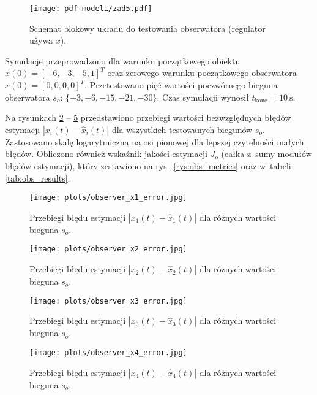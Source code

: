 \documentclass[a4paper,titlepage,11pt,floatssmall]{mwrep} %
\begin{document}
\begin{figure}[H]
    \centering
    \texttt{[image: pdf-modeli/zad5.pdf]}
    \caption{Schemat blokowy układu do testowania obserwatora (regulator używa $x$).}
    \label{rys:test_obs_simulink}
\end{figure}

Symulacje przeprowadzono dla warunku początkowego obiektu $x(0) = [-6, -3, -5, 1]^T$ oraz zerowego warunku początkowego obserwatora $\hat{x}(0) = [0, 0, 0, 0]^T$. Przetestowano pięć wartości poczwórnego bieguna obserwatora $s_o$: $\{-3, -6, -15, -21, -30\}$. Czas symulacji wynosił $t_{\text{konc}} = \SI{10}{\second}$.

Na rysunkach \ref{rys:obs_err_x1} -- \ref{rys:obs_err_x4} przedstawiono przebiegi wartości bezwzględnych błędów estymacji $|x_i(t) - \hat{x}_i(t)|$ dla wszystkich testowanych biegunów $s_o$. Zastosowano skalę logarytmiczną na osi pionowej dla lepszej czytelności małych błędów. Obliczono również wskaźnik jakości estymacji $J_o$ (całka z~sumy modułów błędów estymacji), który zestawiono na rys.~\ref{rys:obs_metrics} oraz w~tabeli \ref{tab:obs_results}.

\begin{figure}[H]
    \centering
    \texttt{[image: plots/observer\_x1\_error.jpg]}
    \caption{Przebiegi błędu estymacji $|x_1(t) - \hat{x}_1(t)|$ dla różnych wartości bieguna $s_o$.}
    \label{rys:obs_err_x1}
\end{figure}

\begin{figure}[H]
    \centering
    \texttt{[image: plots/observer\_x2\_error.jpg]}
    \caption{Przebiegi błędu estymacji $|x_2(t) - \hat{x}_2(t)|$ dla różnych wartości bieguna $s_o$.}
    \label{rys:obs_err_x2}
\end{figure}

\begin{figure}[H]
    \centering
    \texttt{[image: plots/observer\_x3\_error.jpg]}
    \caption{Przebiegi błędu estymacji $|x_3(t) - \hat{x}_3(t)|$ dla różnych wartości bieguna $s_o$.}
    \label{rys:obs_err_x3}
\end{figure}

\begin{figure}[H]
    \centering
    \texttt{[image: plots/observer\_x4\_error.jpg]}
    \caption{Przebiegi błędu estymacji $|x_4(t) - \hat{x}_4(t)|$ dla różnych wartości bieguna $s_o$.}
    \label{rys:obs_err_x4}
\end{figure}
\end{document}
